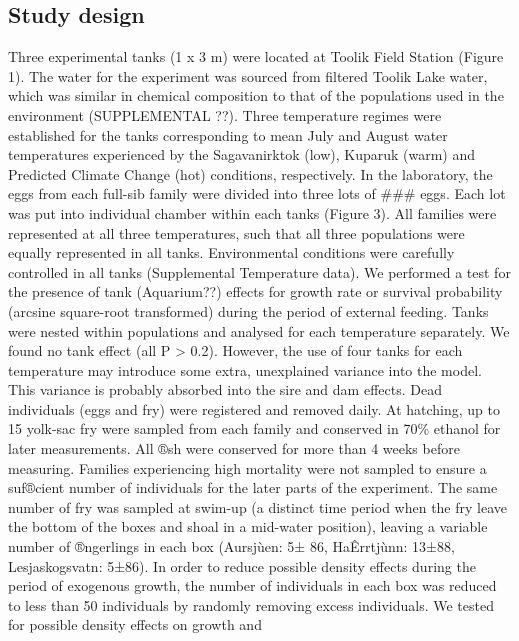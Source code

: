 \documentclass[utf8]{frontiersSCNS}
\begin{document}
\hypertarget{study-design}{%
\subsection*{Study design}\label{study-design}}

Three experimental tanks (1 x 3 m) were located at Toolik Field Station
(Figure 1). The water for the experiment was sourced from filtered
Toolik Lake water, which was similar in chemical composition to that of
the populations used in the environment (SUPPLEMENTAL ??). Three
temperature regimes were established for the tanks corresponding to mean
July and August water temperatures experienced by the Sagavanirktok
(low), Kuparuk (warm) and Predicted Climate Change (hot) conditions,
respectively. In the laboratory, the eggs from each full-sib family were
divided into three lots of \#\#\# eggs. Each lot was put into individual
chamber within each tanks (Figure 3). All families were represented at
all three temperatures, such that all three populations were equally
represented in all tanks. Environmental conditions were carefully
controlled in all tanks (Supplemental Temperature data). We performed a
test for the presence of tank (Aquarium??) effects for growth rate or
survival probability (arcsine square-root transformed) during the period
of external feeding. Tanks were nested within populations and analysed
for each temperature separately. We found no tank effect (all P
\textgreater{} 0.2). However, the use of four tanks for each temperature
may introduce some extra, unexplained variance into the model. This
variance is probably absorbed into the sire and dam effects. Dead
individuals (eggs and fry) were registered and removed daily. At
hatching, up to 15 yolk-sac fry were sampled from each family and
conserved in 70\% ethanol for later measurements. All ®sh were conserved
for more than 4 weeks before measuring. Families experiencing high
mortality were not sampled to ensure a suf®cient number of individuals
for the later parts of the experiment. The same number of fry was
sampled at swim-up (a distinct time period when the fry leave the bottom
of the boxes and shoal in a mid-water position), leaving a variable
number of ®ngerlings in each box (Aursjùen: 5± 86, HaÊrrtjùnn: 13±88,
Lesjaskogsvatn: 5±86). In order to reduce possible density effects
during the period of exogenous growth, the number of individuals in each
box was reduced to less than 50 individuals by randomly removing excess
individuals. We tested for possible density effects on growth and
\end{document}
